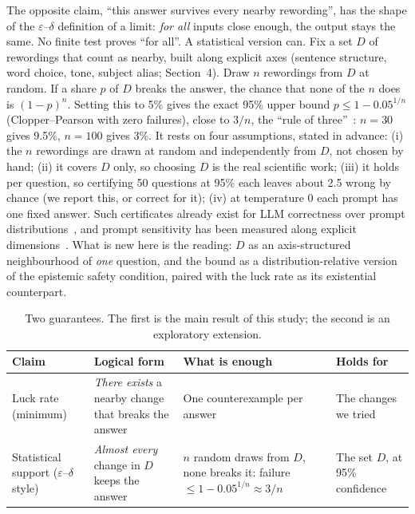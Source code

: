 \documentclass[10pt]{article}
\begin{document}
The opposite claim, ``this answer survives every nearby rewording'', has the shape of the $\varepsilon$--$\delta$ definition of a limit: \emph{for all} inputs close enough, the output stays the same. No finite test proves ``for all''. A statistical version can. Fix a set $D$ of rewordings that count as nearby, built along explicit axes (sentence structure, word choice, tone, subject alias; Section~4). Draw $n$ rewordings from $D$ at random. If a share $p$ of $D$ breaks the answer, the chance that none of the $n$ does is $(1-p)^n$. Setting this to 5\% gives the exact 95\% upper bound $p \le 1-0.05^{1/n}$ (Clopper--Pearson with zero failures), close to $3/n$, the ``rule of three''~\cite{hanley}: $n{=}30$ gives 9.5\%, $n{=}100$ gives 3\%. It rests on four assumptions, stated in advance: (i) the $n$ rewordings are drawn at random and independently from $D$, not chosen by hand; (ii) it covers $D$ only, so choosing $D$ is the real scientific work; (iii) it holds per question, so certifying 50 questions at 95\% each leaves about 2.5 wrong by chance (we report this, or correct for it); (iv) at temperature 0 each prompt has one fixed answer. Such certificates already exist for LLM correctness over prompt distributions~\cite{quacer,zollo}, and prompt sensitivity has been measured along explicit dimensions~\cite{dove,sclar,mizrahi}. What is new here is the reading: $D$ as an axis-structured neighbourhood of \emph{one} question, and the bound as a distribution-relative version of the epistemic safety condition, paired with the luck rate as its existential counterpart.

\begin{table}[h]
\centering\scriptsize\vspace{-0.4em}
\begin{tabularx}{\linewidth}{@{}l Y Y Y@{}}
\toprule
Claim & Logical form & What is enough & Holds for \\
\midrule
Luck rate (minimum) & \emph{There exists} a nearby change that breaks the answer & One counterexample per answer & The changes we tried \\
Statistical support ($\varepsilon$--$\delta$ style) & \emph{Almost every} change in $D$ keeps the answer & $n$ random draws from $D$, none breaks it: failure $\le 1-0.05^{1/n}\approx 3/n$ & The set $D$, at 95\% confidence \\
\bottomrule
\end{tabularx}
\caption{Two guarantees. The first is the main result of this study; the second is an exploratory extension.}
\label{tab:guar}\vspace{-1em}
\end{table}
\end{document}
